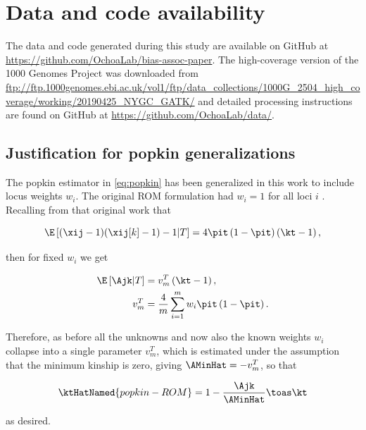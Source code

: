 \documentclass[11pt]{article}
\begin{document}
\begin{linenumbers}
\section*{Data and code availability}
The data and code generated during this study are available on GitHub at \url{https://github.com/OchoaLab/bias-assoc-paper}.
The high-coverage version of the 1000 Genomes Project was downloaded from \url{ftp://ftp.1000genomes.ebi.ac.uk/vol1/ftp/data_collections/1000G_2504_high_coverage/working/20190425_NYGC_GATK/}
and detailed processing instructions are found on GitHub at \url{https://github.com/OchoaLab/data/}.


\printbibliography


\begin{appendices}
  \appendix

  \appendixpage
  
  \section{Justification for popkin generalizations}

  \label{sec:popkin_w_justif}

  The popkin estimator in \cref{eq:popkin} has been generalized in this work to include locus weights $w_i$.
  The original ROM formulation had $w_i=1$ for all loci $i$ \citep{ochoa_estimating_2021}.
  Recalling from that original work that
  \begin{linenomath*}
  $$
  \E \left[ (\xij-1)(\xij[k]-1) - 1 \middle| T \right]
  =
  4 \pit \left( 1 - \pit \right) \left( \kt - 1 \right),
  $$
  \end{linenomath*}
  then for fixed $w_i$ we get
  \begin{linenomath*}
  \begin{align*}
    \E \left[ \Ajk \middle| T \right]
    &=
      v_m^T \left( \kt - 1 \right)
      , \\
    v_m^T
    &=
      \frac{4}{m} \sum_{i=1}^m w_i \pit \left( 1 - \pit \right)
      .
  \end{align*}
  \end{linenomath*}
  Therefore, as before all the unknowns \pit and now also the known weights $w_i$ collapse into a single parameter $v_m^T$, which is estimated under the assumption that the minimum kinship is zero, giving $\AMinHat = -v_m^T$, so that
  \begin{linenomath*}
  $$
  \ktHatNamed{popkin-ROM}
  =
  1 - \frac{\Ajk}{\AMinHat}
  \toas
  \kt
  $$
  \end{linenomath*}
  as desired.


\end{appendices}
\end{linenumbers}
\end{document}
